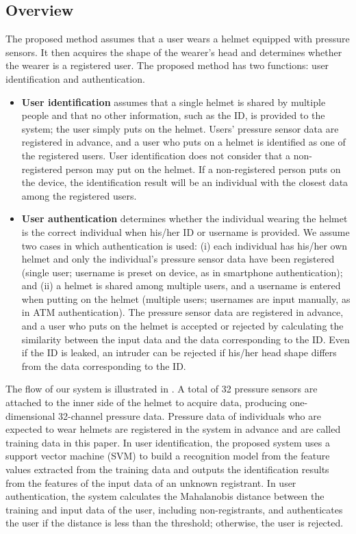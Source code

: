 \documentclass[english,preprint,JIP]{ipsj}
\begin{document}
\subsection{Overview}
The proposed method assumes that a user wears a helmet equipped with pressure sensors. It then acquires the shape of the wearer's head and determines whether the wearer is a registered user. The proposed method has two functions: user identification and authentication.
\begin{itemize}
    \item {\bf User identification} assumes that a single helmet is shared by multiple people and that no other information, such as the ID, is provided to the system; the user simply puts on the helmet. Users' pressure sensor data are registered in advance, and a user who puts on a helmet is identified as one of the registered users. User identification does not consider that a non-registered person may put on the helmet. If a non-registered person puts on the device, the identification result will be an individual with the closest data among the registered users.

    \item {\bf User authentication} determines whether the individual wearing the helmet is the correct individual when his/her ID or username is provided. We assume two cases in which authentication is used: (i) each individual has his/her own helmet and only the individual's pressure sensor data have been registered (single user; username is preset on device, as in smartphone authentication); and (ii) a helmet is shared among multiple users, and a username is entered when putting on the helmet (multiple users; usernames are input manually, as in ATM authentication). The pressure sensor data are registered in advance, and a user who puts on the helmet is accepted or rejected by calculating the similarity between the input data and the data corresponding to the ID. Even if the ID is leaked, an intruder can be rejected if his/her head shape differs from the data corresponding to the ID.
\end{itemize}

The flow of our system is illustrated in . A total of 32 pressure sensors are attached to the inner side of the helmet to acquire data, producing one-dimensional 32-channel pressure data. Pressure data of individuals who are expected to wear helmets are registered in the system in advance and are called training data in this paper. In user identification, the proposed system uses a support vector machine (SVM) to build a recognition model from the feature values extracted from the training data and outputs the identification results from the features of the input data of an unknown registrant. In user authentication, the system calculates the Mahalanobis distance between the training and input data of the user, including non-registrants, and authenticates the user if the distance is less than the threshold; otherwise, the user is rejected.
\end{document}
